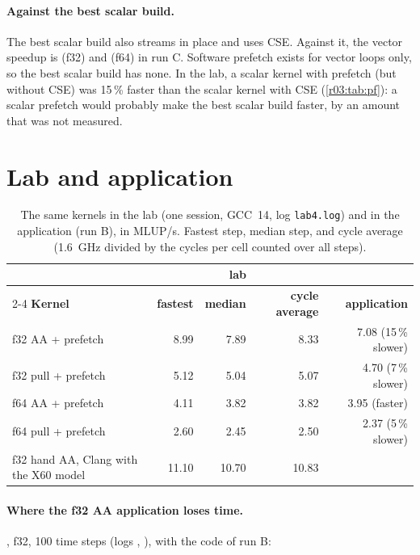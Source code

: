 \paragraph{Against the best scalar build.} The best scalar build also streams in place and uses
CSE. Against it, the vector speedup is  (f32) and  (f64) in run C. Software
prefetch exists for vector loops only, so the best scalar build has none. In the lab, a scalar
kernel with prefetch (but without CSE) was 15\,\% faster than the scalar kernel with CSE
(\cref{r03:tab:pf}): a scalar prefetch would probably make the best scalar build faster, by an
amount that was not measured.

\section{Lab and application}\label{r03:sec:res-labapp}

\begin{table}[htbp]
  \centering\small
  \caption{The same kernels in the lab (one session, GCC~14, log \texttt{lab4.log}) and in the
    application (run B), in MLUP/s. Fastest step, median step, and cycle average (1.6~GHz divided
    by the cycles per cell counted over all steps).}\label{r03:tab:labapp}
  \begin{tabular}{@{}lrrrr@{}}
    \toprule
    & \multicolumn{3}{c}{\textbf{lab}} & \\
    \cmidrule(lr){2-4}
    \textbf{Kernel} & \textbf{fastest} & \textbf{median} & \textbf{cycle average} & \textbf{application}\\
    \midrule
    f32 AA + prefetch & 8.99 & 7.89 & 8.33 & 7.08 (15\,\% slower)\\
    f32 pull + prefetch & 5.12 & 5.04 & 5.07 & 4.70 (7\,\% slower)\\
    f64 AA + prefetch & 4.11 & 3.82 & 3.82 & 3.95 (faster)\\
    f64 pull + prefetch & 2.60 & 2.45 & 2.50 & 2.37 (5\,\% slower)\\
    f32 hand AA, Clang with the X60 model & 11.10 & 10.70 & 10.83 &\\
    \bottomrule
  \end{tabular}
\end{table}

\paragraph{Where the f32 AA application loses time.} , f32, 100
time steps (logs , ), with the code of run B:

